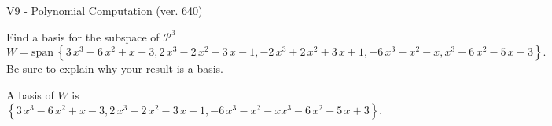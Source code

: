 \begin{exercise}
  \begin{exerciseTitle}V9 - Polynomial Computation (ver. 640)\end{exerciseTitle}
  \begin{exerciseStatement}
    Find a basis for the subspace of \(\mathcal{P}^3\) 
\[W=\mathrm{span}\ \left\{3 \, x^{3} - 6 \, x^{2} + x - 3 , 2 \, x^{3} - 2 \, x^{2} - 3 \, x - 1 , -2 \, x^{3} + 2 \, x^{2} + 3 \, x + 1 , -6 \, x^{3} - x^{2} - x , x^{3} - 6 \, x^{2} - 5 \, x + 3\right\}.\]
 Be sure to explain why your result is a basis.


  \end{exerciseStatement}
  \begin{exerciseAnswer}
   A basis of \(W\) is  \(\left\{3 \, x^{3} - 6 \, x^{2} + x - 3 , 2 \, x^{3} - 2 \, x^{2} - 3 \, x - 1 , -6 \, x^{3} - x^{2} - x x^{3} - 6 \, x^{2} - 5 \, x + 3\right\}\).
  


  \end{exerciseAnswer}
\end{exercise}